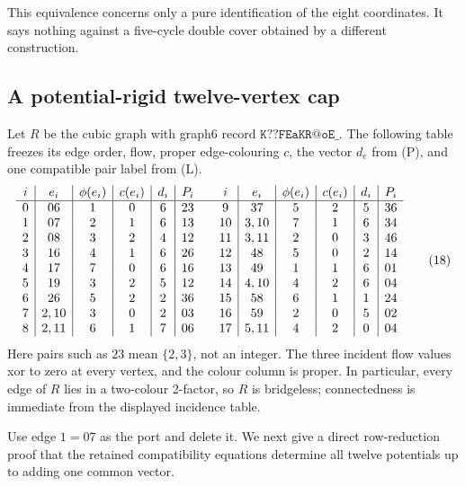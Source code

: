 \documentclass[11pt]{article}
\theoremstyle{definition}
\theoremstyle{remark}
\begin{document}
This equivalence concerns only a pure identification of the eight
coordinates.  It says nothing against a five-cycle double cover obtained
by a different construction.

\subsection{A potential-rigid twelve-vertex cap}

Let \(R\) be the cubic graph with graph6 record
\(\texttt{K??FEaKR@oE\_}\).  The following table freezes its edge order,
flow, proper edge-colouring \(c\), the vector \(d_e\) from (P), and one
compatible pair label from (L).
\[
\begin{array}{c|c|c|c|c|c@{\qquad}c|c|c|c|c|c}
i&e_i&\phi(e_i)&c(e_i)&d_i&P_i&
i&e_i&\phi(e_i)&c(e_i)&d_i&P_i\\ \hline
0&06&1&0&6&23& 9&37&5&2&5&36\\
1&07&2&1&6&13&10&3,10&7&1&6&34\\
2&08&3&2&4&12&11&3,11&2&0&3&46\\
3&16&4&1&6&26&12&48&5&0&2&14\\
4&17&7&0&6&16&13&49&1&1&6&01\\
5&19&3&2&5&12&14&4,10&4&2&6&04\\
6&26&5&2&2&36&15&58&6&1&1&24\\
7&2,10&3&0&2&03&16&59&2&0&5&02\\
8&2,11&6&1&7&06&17&5,11&4&2&0&04
\end{array}                                                       \tag{18}
\]
Here pairs such as \(23\) mean \(\{2,3\}\), not an integer.
The three incident flow values xor to zero at every vertex, and the
colour column is proper.  In particular, every edge of \(R\) lies in a
two-colour 2-factor, so \(R\) is bridgeless; connectedness is immediate
from the displayed incidence table.

Use edge \(1=07\) as the port and delete it.  We next give a direct
row-reduction proof that the retained compatibility equations determine
all twelve potentials up to adding one common vector.
\end{document}
